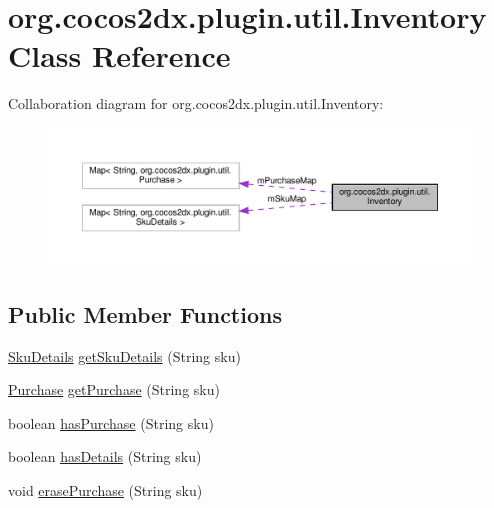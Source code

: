 \hypertarget{classorg_1_1cocos2dx_1_1plugin_1_1util_1_1Inventory}{}\section{org.\+cocos2dx.\+plugin.\+util.\+Inventory Class Reference}
\label{classorg_1_1cocos2dx_1_1plugin_1_1util_1_1Inventory}


Collaboration diagram for org.\+cocos2dx.\+plugin.\+util.\+Inventory\+:
\nopagebreak
\begin{figure}[H]
\begin{center}
\leavevmode
\includegraphics[width=350pt]{classorg_1_1cocos2dx_1_1plugin_1_1util_1_1Inventory__coll__graph}
\end{center}
\end{figure}
\subsection*{Public Member Functions}
\begin{DoxyCompactItemize}
\item 
\hyperlink{classorg_1_1cocos2dx_1_1plugin_1_1util_1_1SkuDetails}{Sku\+Details} \hyperlink{classorg_1_1cocos2dx_1_1plugin_1_1util_1_1Inventory_ac70d891f17efa646a9d72f1d05b65d6e}{get\+Sku\+Details} (String sku)
\item 
\hyperlink{classorg_1_1cocos2dx_1_1plugin_1_1util_1_1Purchase}{Purchase} \hyperlink{classorg_1_1cocos2dx_1_1plugin_1_1util_1_1Inventory_a13b3181f29640855a9150998ac10db02}{get\+Purchase} (String sku)
\item 
boolean \hyperlink{classorg_1_1cocos2dx_1_1plugin_1_1util_1_1Inventory_ab3594605b252244f49c65238c930b3f5}{has\+Purchase} (String sku)
\item 
boolean \hyperlink{classorg_1_1cocos2dx_1_1plugin_1_1util_1_1Inventory_a5a47dba6ae3d3d90d558e200be08cb58}{has\+Details} (String sku)
\item 
void \hyperlink{classorg_1_1cocos2dx_1_1plugin_1_1util_1_1Inventory_a74df7fe3843c49ac093af1fcca2ce86b}{erase\+Purchase} (String sku)
\end{DoxyCompactItemize}


